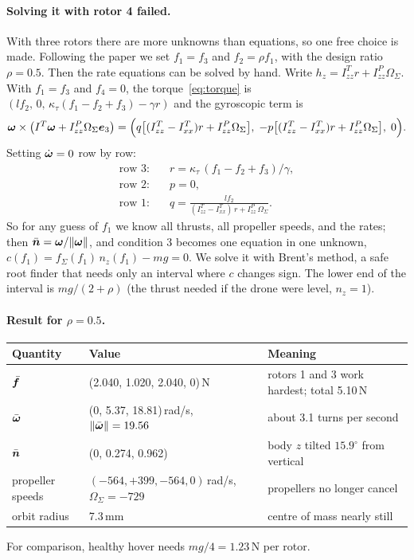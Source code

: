 \paragraph{Solving it with rotor 4 failed.} With three rotors there are more unknowns than equations, so one free choice is made. Following the paper we set $f_1 = f_3$ and $f_2 = \rho f_1$, with the design ratio $\rho = 0.5$. Then the rate equations can be solved by hand. Write $h_z = I^T_{zz}r + I^P_{zz}\Omega_\Sigma$. With $f_1=f_3$ and $f_4=0$, the torque~\eqref{eq:torque} is $(l f_2,\,0,\,\kappa_\tau(f_1-f_2+f_3)-\gamma r)$ and the gyroscopic term is
\begin{equation}
  \boldsymbol{\omega}\times\big(I^T\boldsymbol{\omega} + I^P_{zz}\Omega_\Sigma\boldsymbol{e}_3\big) = \Big( q\big[(I^T_{zz}-I^T_{xx})r + I^P_{zz}\Omega_\Sigma\big],\; -p\big[(I^T_{zz}-I^T_{xx})r + I^P_{zz}\Omega_\Sigma\big],\; 0 \Big).
\end{equation}
Setting $\dot{\boldsymbol{\omega}}=0$ row by row:
\begin{align}
  \text{row 3:}\quad & r = \kappa_\tau\,(f_1 - f_2 + f_3)/\gamma,\\
  \text{row 2:}\quad & p = 0,\\
  \text{row 1:}\quad & q = \frac{l f_2}{(I^T_{zz}-I^T_{xx})\,r + I^P_{zz}\,\Omega_\Sigma}.
\end{align}
So for any guess of $f_1$ we know all thrusts, all propeller speeds, and the rates; then $\bar{\boldsymbol{n}} = \boldsymbol{\omega}/\|\boldsymbol{\omega}\|$, and condition 3 becomes one equation in one unknown, $c(f_1) = f_\Sigma(f_1)\,n_z(f_1) - mg = 0$. We solve it with Brent's method, a safe root finder that needs only an interval where $c$ changes sign. The lower end of the interval is $mg/(2+\rho)$ (the thrust needed if the drone were level, $n_z = 1$).

\paragraph{Result for $\rho = 0.5$.}
\begin{center}
\small
\begin{tabularx}{\linewidth}{l l L}
\toprule
Quantity & Value & Meaning \\
\midrule
$\bar{\boldsymbol{f}}$ & (2.040, 1.020, 2.040, 0)\,N & rotors 1 and 3 work hardest; total 5.10\,N \\
$\bar{\boldsymbol{\omega}}$ & (0, 5.37, 18.81)\,rad/s, $\|\bar{\boldsymbol{\omega}}\| = 19.56$ & about 3.1 turns per second \\
$\bar{\boldsymbol{n}}$ & (0, 0.274, 0.962) & body $z$ tilted $15.9^\circ$ from vertical \\
propeller speeds & $(-564, +399, -564, 0)$\,rad/s, $\Omega_\Sigma = -729$ & propellers no longer cancel \\
orbit radius & 7.3\,mm & centre of mass nearly still \\
\bottomrule
\end{tabularx}
\end{center}
For comparison, healthy hover needs $mg/4 = 1.23$\,N per rotor.

